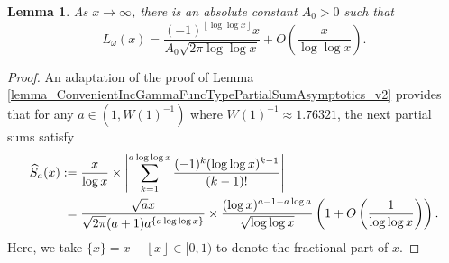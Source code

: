 \documentclass[11pt,reqno,a4letter]{article}
\newcommand{\hlocalref}[1]{\hyperref[#1]{\ref{#1}}}
\numberwithin{equation}{section}
\numberwithin{figure}{section}
\numberwithin{table}{section}
\newcommand{\floor}[1]{\left\lfloor #1 \right\rfloor}
\theoremstyle{plain}
\newtheorem{lemma}[theorem]{Lemma}
\numberwithin{theorem}{section}
\theoremstyle{definition}
\begin{document}
\begin{lemma} 
\label{cor_AsymptoticsForSignedSumsOfomegan_v1}
As $x \rightarrow \infty$, there is an absolute constant $A_0 > 0$ such that 
\[
L_{\omega}(x) = 
     \frac{(-1)^{\floor{\log\log x}} x}{A_0 \sqrt{2\pi \log\log x}} + 
     O\left(\frac{x}{\log\log x}\right). 
\]
\end{lemma}
\begin{proof}
An adaptation of the proof of 
Lemma \hlocalref{lemma_ConvenientIncGammaFuncTypePartialSumAsymptotics_v2} 
provides that for any $a \in \left(1, W(1)^{-1}\right)$ where 
$W(1)^{-1} \approx 1.76321$, the next partial sums satisfy 
\begin{align}
\notag 
\widehat{S}_a(x) & := 
     \frac{x}{\log x} \times \left\lvert \sum_{k=1}^{a \log\log x} \frac{(-1)^{k} (\log\log x)^{k-1}}{(k-1)!} 
     \right\rvert \\ 
\label{eqn_ConvenientIncGammaFuncTypePartialSumAsymptotics_va3} 
	& \phantom{:} = \frac{\sqrt{a} x}{\sqrt{2\pi}(a+1) a^{\{a\log\log x\}}} 
     \times \frac{(\log x)^{a-1-a\log a}}{\sqrt{\log\log x}} 
     \left(1 + O\left(\frac{1}{\log\log x}\right)\right). 
\end{align}
Here, we take $\{x\} = x - \floor{x} \in [0, 1)$ to denote the fractional part of $x$. 


\end{proof}
\end{document}
